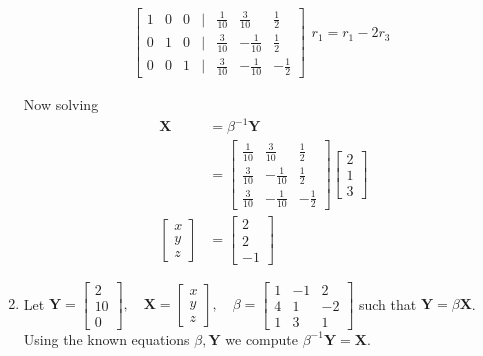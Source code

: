 \documentclass[12pt]{article}
\begin{document}
\begin{enumerate}
\begin{align*}
\begin{bmatrix}
                   1&0&0 &|& \frac{1}{10}&\frac{3}{10}&\frac{1}{2}
                    \\  0 & 1&0  &|& \frac{3}{10}&-\frac{1}{10}&\frac{1}{2}
                    \\0&0&1 &|&\frac{3}{10}&-\frac{1}{10}&-\frac{1}{2}
                \end{bmatrix}\begin{matrix}
                    r_1 = r_1 -2r_3
                    \\ %
                    \\%
                    \\ 
                \end{matrix}
        \end{align*}

         Now solving
        \begin{align*}
            \mathbf{X}&= \beta^{-1} \mathbf{Y}
            \\ &= \begin{bmatrix}
                    \frac{1}{10}&\frac{3}{10}&\frac{1}{2}
                    \\ \frac{3}{10}&-\frac{1}{10}&\frac{1}{2}
                    \\ \frac{3}{10}&-\frac{1}{10}&-\frac{1}{2}
                \end{bmatrix}\begin{bmatrix}
        2\\1\\3 \end{bmatrix}
                \\ \begin{bmatrix}
            x \\ y\\ z
        \end{bmatrix}&= \begin{bmatrix}
                    2
                    \\ 2
                    \\ -1
                \end{bmatrix}
        \end{align*}


    \item Let $\mathbf{Y} = \begin{bmatrix}
        2\\10\\0 \end{bmatrix}, \quad  \mathbf{X} = \begin{bmatrix}
            x \\ y\\ z
        \end{bmatrix}, \quad \beta = \begin{bmatrix}
            1&-1&2 \\ 4&1&-2 \\ 1&3&1
        \end{bmatrix}$ such that $\mathbf{Y}=\beta\mathbf{X}$. Using the known equations $\beta, \mathbf{Y}$ we compute $\beta^{-1} \mathbf{Y}= \mathbf{X}$.


\end{enumerate}
\end{document}
